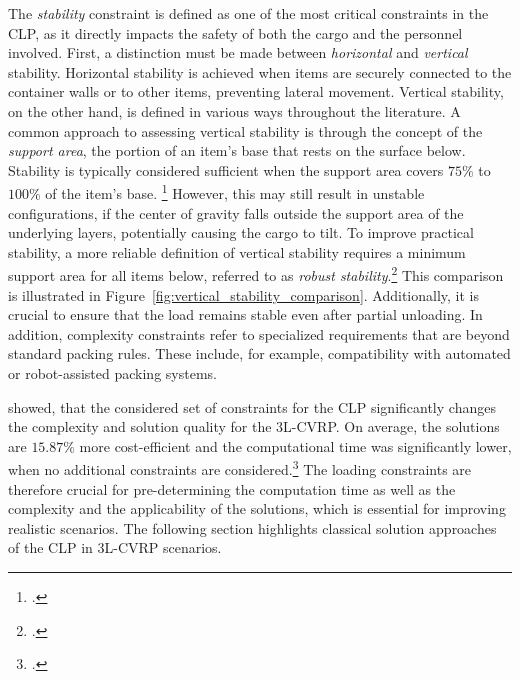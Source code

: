 The \textit{stability} constraint is defined as one of the most critical constraints
in the \gls{CLP}, as it directly impacts the safety of both the cargo and the personnel involved.
First, a distinction must be made between \textit{horizontal} and \textit{vertical} stability.
Horizontal stability is achieved when items are securely connected to the
container walls or to other items, preventing lateral movement. Vertical
stability, on the other hand, is defined in various ways throughout the
literature. A common approach to assessing vertical stability is through the concept of the \textit{support
	area}, the portion of an item's base that rests on the surface below. Stability is typically
considered sufficient when the support area covers $75\%$ to $100\%$ of the item’s base. \footcite[cf.][p. 344]{gendreau_tabu_2006} However,
this may still result in unstable configurations, if the center of gravity falls outside the
support area of the underlying layers, potentially causing the cargo to tilt. To improve practical stability,
a more reliable definition of vertical stability requires a minimum support area for all items below,
referred to as \textit{robust stability}.\footcite[cf.][p. 1140]{ceschia_local_2013} This comparison is illustrated in Figure~\ref{fig:vertical_stability_comparison}.
Additionally, it is crucial to ensure that the load remains stable even after partial unloading.
In addition, complexity constraints refer to specialized
requirements that are beyond standard packing rules. These include, for example, compatibility with automated or robot-assisted packing systems.


\cite{gendreau_tabu_2006} showed, that the considered set of constraints for the \gls{CLP} significantly
changes the complexity and solution quality for the \gls{3L-CVRP}. On average, the solutions are $15.87\%$ more
cost-efficient and the computational time was significantly lower, when no additional constraints are considered.\footcite[cf.][p. 348]{gendreau_tabu_2006}
The loading constraints are therefore crucial for pre-determining the computation time as well as the complexity and the applicability
of the solutions, which is essential for improving realistic scenarios.
The following section highlights classical solution approaches of the \gls{CLP} in \gls{3L-CVRP} scenarios.


